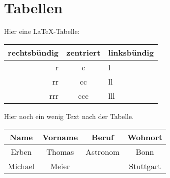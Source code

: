 \documentclass[a4paper,12pt]{scrartcl}
\begin{document}
%
\section{Tabellen}
Hier eine \LaTeX-Tabelle:
%
\begin{center}
  \begin{tabular}{|r|c|l||}
    rechtsbündig & zentriert & linksbündig \\
    \hline
    r            & c           & l \\
    rr           & cc          & ll \\
    rrr          & ccc         & lll \\
  \end{tabular}
\end{center}
Hier noch ein wenig Text nach der Tabelle.
%
\begin{center}
  \begin{tabular}{|c|c|c|c|}
  Name & Vorname & Beruf & Wohnort \\
  \hline
  Erben & Thomas & Astronom & Bonn  \\
  Michael & Meier & & Stuttgart  \\
  \end{tabular}
\end{center}
\end{document}
